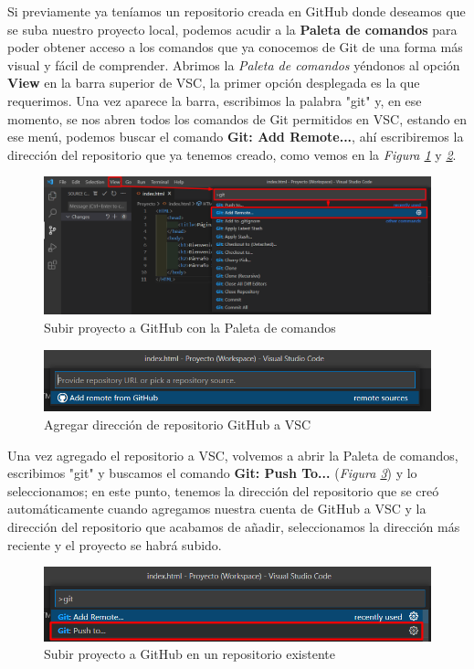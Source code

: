 Si previamente ya teníamos un repositorio creada en GitHub donde deseamos que se suba nuestro proyecto local, podemos acudir a la \textbf{Paleta de comandos} para poder obtener acceso a los comandos que ya conocemos de Git de una forma más visual y fácil de comprender. Abrimos la \textit{Paleta de comandos} yéndonos al opción \textbf{View} en la barra superior de VSC, la primer opción desplegada es la que requerimos. Una vez aparece la barra, escribimos la palabra "git" y, en ese momento, se nos abren todos los comandos de Git permitidos en VSC, estando en ese menú, podemos buscar el comando \textbf{Git: Add Remote...}, ahí escribiremos la dirección del repositorio que ya tenemos creado, como vemos en la \textit{Figura \ref{fig: 29}} y \textit{\ref{fig: 30}}.
\begin{figure}[H]
    \centering
    \caption{Subir proyecto a GitHub con la Paleta de comandos}
    \label{fig: 29}
    \includegraphics[width=13cm]{capturas/subir_proyecto3.png}
\end{figure}
\begin{figure}[H]
    \centering
    \caption{Agregar dirección de repositorio GitHub a VSC}
    \label{fig: 30}
    \includegraphics[width=13cm]{capturas/subir_proyecto4.png}
\end{figure}

Una vez agregado el repositorio a VSC, volvemos a abrir la Paleta de comandos, escribimos "git" y buscamos el comando \textbf{Git: Push To...} (\textit{Figura \ref{fig: 31}}) y lo seleccionamos; en este punto, tenemos la dirección del repositorio que se creó automáticamente cuando agregamos nuestra cuenta de GitHub a VSC y la dirección del repositorio que acabamos de añadir, seleccionamos la dirección más reciente y el proyecto se habrá subido.
\begin{figure}[H]
    \centering
    \caption{Subir proyecto a GitHub en un repositorio existente}
    \label{fig: 31}
    \includegraphics[width=13cm]{capturas/subir_proyecto5.png}
\end{figure}

